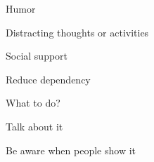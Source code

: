 \documentclass[aspectratio=169]{beamer}
\begin{document}
\begin{frame}
  \begin{center}
    \Huge Humor
    \\ \small \cite{hh15}
  \end{center}
\end{frame}

\begin{frame}
  \begin{center}
    \Huge Distracting thoughts or activities
    \\ \small \cite{hh15}
  \end{center}
\end{frame}

\begin{frame}
  \begin{center}
    \Huge Social support
    \\ \small \cite{caltech}
  \end{center}
\end{frame}

\begin{frame}
  \begin{center}
    \Huge Reduce dependency
    \\ \small \cite{langford93}
  \end{center}
\end{frame}

\begin{frame}
  \begin{center}
    \Huge What to do?
  \end{center}
\end{frame}

\begin{frame}
  \begin{center}
    \Huge Talk about it
    \small
  \end{center}
\end{frame}

\begin{frame}
  \begin{center}
    \Huge Be aware when people show it
    \small
  \end{center}
\end{frame}
\end{document}
